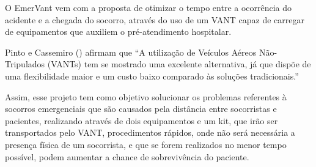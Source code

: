 O  EmerVant  vem  com a  proposta  de otimizar  o tempo  entre  a ocorrência do acidente  e a chegada  do socorro, através do uso de um VANT capaz de carregar de equipamentos que auxiliem o pré-atendimento hospitalar. 

Pinto e Cassemiro (\citeyear{pinto}) afirmam que ``A utilização de Veículos Aéreos Não-Tripulados (VANTs) tem se mostrado uma excelente alternativa, já que dispõe de uma flexibilidade maior e um custo baixo comparado às soluções tradicionais.''

Assim, esse projeto tem como objetivo solucionar os problemas referentes à socorros emergenciais que são causados pela distância entre socorristas e pacientes, realizando através de dois equipamentos e um kit, que irão ser transportados pelo VANT, procedimentos rápidos, onde não será necessária a presença física de um socorrista, e que se forem realizados no menor tempo possível, podem aumentar a chance de sobrevivência do paciente.
